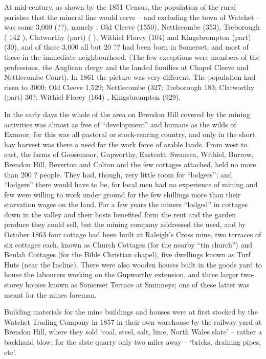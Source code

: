 \documentclass[11pt]{book}
\begin{document}
At mid-century, as shown by the 1851 Census, the population of the rural parishes that the mineral line would serve – and excluding the town  of Watchet – was some 3,000 (??), namely : Old Cleeve  (1550), Nettlecombe (353), Treborough ( 142  ), Clatworthy (part) (        ), Withiel Florey (104)  and Kingsbrompton (part) (30), and of those 3,000  all  but 20 ?? had been born in Somerset, and most of these in the immediate neighbourhood.  (The few exceptions were members of the professions, the Anglican clergy and the landed families at Chapel Cleeve and Nettlecombe Court). In 1861 the picture was very different. The population had risen to 3000: Old Cleeve 1,529; Nettlecombe (327; Treborough 183; Clatworthy (part)  30?; Withiel Florey  (164) , Kingsbrompton (929). 

In the early days the whole of the area on Brendon Hill covered by the mining activities was almost as free of “development” and humans as the wilds of Exmoor, for this was all pastoral or stock-rearing country, and only in the short hay harvest was there a need for the work force of arable lands. From west to east, the farms of Goosemoor, Gupworthy, Eastcott, Swansea, Withiel, Burrow, Brendon Hill, Beverton and Colton and the few cottages attached, held no more than 200 ?    people.   They had, though, very little room for “lodgers”; and “lodgers” there would have to be, for local men had no experience of mining and few were willing to work under ground for the few shillings more than their starvation wages on the land. For a few years the miners “lodged” in cottages down in the valley and their hosts benefited form the rent and the garden produce they could sell, but the mining company addressed the need, and by October 1863 four cottage had been built at Raleigh’s Cross mine, two  terraces of six cottages each, known as Church Cottages (for the nearby “tin church”) and Beulah Cottages (for the Bible Christian chapel), five dwellings known as Turf Huts (near the Incline). There were also wooden houses built in the goods yard to house the labourers working on the Gupworthy extension, and three larger two-storey houses known as Somerset Terrace at Sminneys; one of these latter was meant for the mines foreman. 

Building materials for the mine buildings and houses were at first stocked by the Watchet Trading Company in 1857 in their own warehouse by the railway yard at Brendon Hill, where they sold ‘coal, steel, salt, lime, North Wales slate’ – rather a backhand blow, for the slate quarry only two miles away – ‘bricks, draining pipes, etc’.
\end{document}
